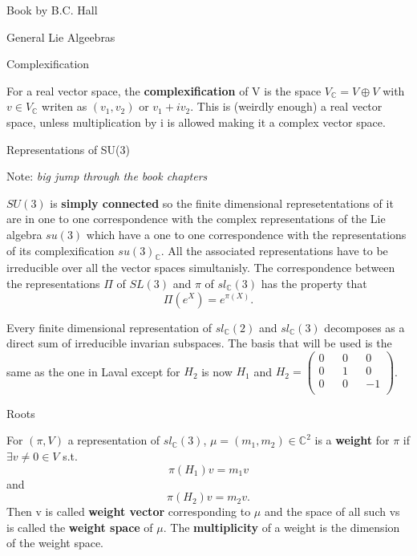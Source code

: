 \documentclass[12pt, letterpaper]{article}
\newcommand{\C}{\mathbb{C}}
\begin{document}
\begin{section}{Book by B.C. Hall}
\begin{subsection}{General Lie Algeebras}
    \begin{subsubsection}{Complexification}

      For a real vector space, the \textbf{complexification} of V is the space
      \(V_{\C} = V \oplus V\) with \(v \in V_{\C}\) writen as \((v_{1}, v_{2})\)
      or \(v_{1} + iv_{2}\). This is (weirdly enough) a real vector space,
      unless multiplication by i is allowed making it a complex vector space.

    \end{subsubsection}

  \end{subsection}

  \begin{subsection}{Representations of SU(3)}

    Note: \emph{big jump through the book chapters}

    \(SU(3)\) is \textbf{simply connected} so the finite dimensional
    represetentations of it are in one to one correspondence with the complex
    representations of the Lie algebra \(su(3)\) which have a one to one
    correspondence with the representations of its complexification
    \(su(3)_{\C}\). All the associated representations have to be irreducible
    over all the vector spaces simultanisly. The correspondence between the
    representations \(\Pi\) of \(SL(3)\) and \(\pi\) of \(sl_{\C}(3)\) has the
    property that \[\Pi(e^{X}) = e^{\pi(X)}.\]

    Every finite dimensional representation of \(sl_{\C}(2)\) and \(sl_{\C}(3)\)
    decomposes as a direct sum of irreducible invarian subspaces. The basis that
    will be used is the same as the one in Laval except for \(H_{2}\) is now
    \(H_{1}\) and \(H_{2} =
    \begin{pmatrix}
      0 && 0 && 0 \\
      0 && 1 && 0 \\
      0 && 0 && -1 \\
    \end{pmatrix}\).

    \begin{subsubsection}{Roots}

      For \((\pi, V)\) a representation of \(sl_{\C}(3)\),
      \(\mu = (m_{1}, m_{2}) \in \C^{2}\) is a \textbf{weight} for \(\pi\) if
      \(\exists v \neq 0 \in V\) s.t.\ \[\pi(H_{1})v = m_{1}v\]
      and \[\pi(H_{2})v = m_{2}v.\] Then v is called \textbf{weight vector}
      corresponding to \(\mu\) and the space of all such vs is called the
      \textbf{weight space} of \(\mu\). The \textbf{multiplicity} of a weight
      is the dimension of the weight space.


\end{subsubsection}
\end{subsection}
\end{section}
\end{document}
